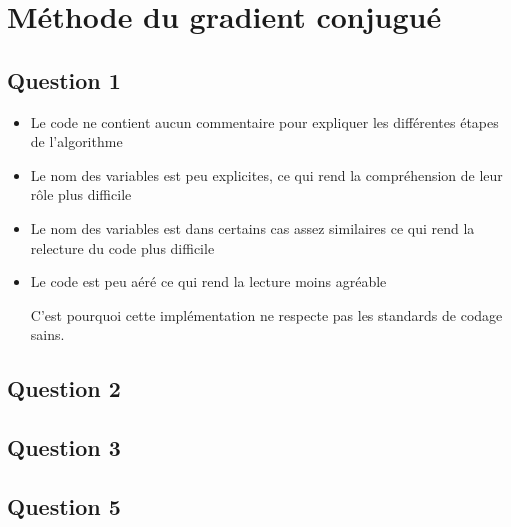 \section{Méthode du gradient conjugué}

\subsection{Question 1}
\begin{itemize}
    \item{Le code ne contient aucun commentaire pour expliquer les différentes étapes de l'algorithme}
    \item{Le nom des variables est peu explicites, ce qui rend la compréhension de leur rôle plus difficile}
    \item{Le nom des variables est dans certains cas assez similaires ce qui rend la relecture du code plus difficile}
    \item{Le code est peu aéré ce qui rend la lecture moins agréable}

    C'est pourquoi cette implémentation ne respecte pas les standards de codage sains.
\end{itemize}

\subsection{Question 2}


\subsection{Question 3}

\subsection{Question 5}
